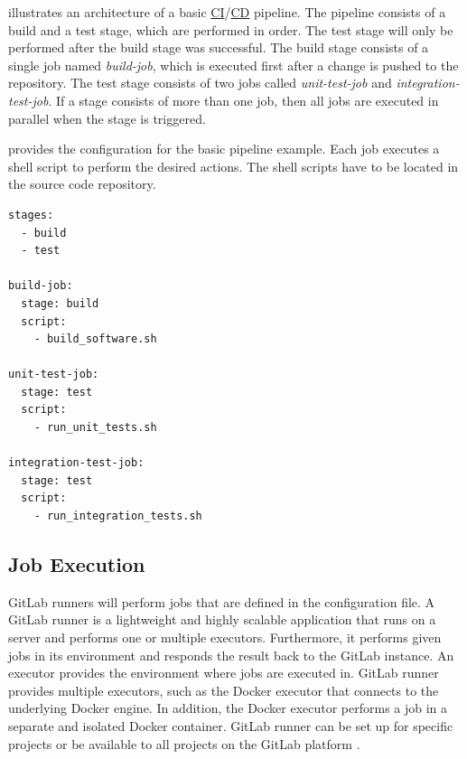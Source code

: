  illustrates an architecture of a basic \hyperlink{abbr:ci}{CI}/\hyperlink{abbr:cd}{CD} pipeline.
The pipeline consists of a build and a test stage, which are performed in order. The test stage will only be performed after the build stage was successful.
The build stage consists of a single job named \textit{build-job}, which is executed first after a change is pushed to the repository.
The test stage consists of two jobs called \textit{unit-test-job} and \textit{integration-test-job}. If a stage consists of more than one job, then all jobs are executed in parallel when the stage is triggered.



 provides the configuration for the basic pipeline example.
Each job executes a shell script to perform the desired actions. The shell scripts have to be located in the source code repository.
\newpage
\begin{lstlisting}[label=lst:04_gitlab_pipeline_basic_config-example, caption=Example of a \texttt{.gitlab-ci.yml} configuration file]
stages:
  - build
  - test

build-job:
  stage: build
  script:
    - build_software.sh

unit-test-job:
  stage: test
  script:
    - run_unit_tests.sh
    
integration-test-job:
  stage: test
  script:
    - run_integration_tests.sh
\end{lstlisting}


\subsection{Job Execution}
\label{sec:04_background_gitlab_job}
GitLab runners will perform jobs that are defined in the configuration file. 
A GitLab runner is a lightweight and highly scalable application that runs on a server and performs one or multiple executors. Furthermore, it performs given jobs in its environment and responds the result back to the GitLab instance.
An executor provides the environment where jobs are executed in. GitLab runner provides multiple executors, such as the Docker executor that connects to the underlying Docker engine. In addition, the Docker executor performs a job in a separate and isolated Docker container.
GitLab runner can be set up for specific projects or be available to all projects on the GitLab platform \cite{Gitlab2020Docs}.


